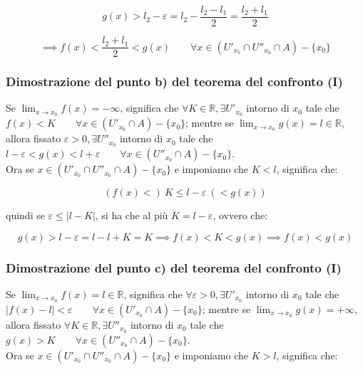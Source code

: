 \documentclass{article}
\begin{document}
\begin{equation*}
    g(x) > l_2 - \varepsilon = l_2 - \frac{l_2 - l_1}{2} = \frac{l_2 + l_1}{2}
\end{equation*}

\begin{equation*}
    \implies f(x) < \frac{l_2 + l_1}{2} < g(x) \qquad \forall x \in (U'_{x_0} \cap U''_{x_0} \cap A) - \{x_0\}
\end{equation*}

\subsubsection{Dimostrazione del punto b) del teorema del confronto (I)}
Se $\lim_{x \to x_0} f(x) = - \infty$, significa che $\forall K \in \mathbb{R}, \exists U'_{x_0}$ intorno di $x_0$ tale che $f(x) < K \qquad \forall x \in (U'_{x_0} \cap A) - \{x_0\}$; mentre se $\lim_{x \to x_0} g(x) = l \in \mathbb{R}$, allora fissato $\varepsilon > 0, \exists U''_{x_0}$ intorno di $x_0$ tale che $l - \varepsilon < g(x) < l + \varepsilon \qquad \forall x \in (U''_{x_0} \cap A) - \{x_0\}$.\\
Ora se $x \in (U'_{x_0} \cap U''_{x_0} \cap A) - \{x_0\}$ e imponiamo che $K < l$, significa che:

\begin{equation*}
    (f(x) <) \ K \leq l - \varepsilon \ (< g(x))
\end{equation*}

\noindent quindi se $\varepsilon \leq |l - K|$, si ha che al più $K = l - \varepsilon$, ovvero che:

\begin{equation*}
    g(x) > l - \varepsilon = l - l + K = K \implies f(x) < K < g(x) \implies f(x) < g(x)
\end{equation*}

\subsubsection{Dimostrazione del punto c) del teorema del confronto (I)}
Se $\lim_{x \to x_0} f(x) = l \in \mathbb{R}$, significa che $\forall \varepsilon > 0, \exists U'_{x_0}$ intorno di $x_0$ tale che $|f(x) - l| < \varepsilon \qquad \forall x \in (U'_{x_0} \cap A) - \{x_0\}$; mentre se $\lim_{x \to x_0} g(x) = +\infty$, allora fissato $\forall K \in \mathbb{R}, \exists U''_{x_0}$ intorno di $x_0$ tale che $g(x) > K \qquad \forall x \in (U''_{x_0} \cap A) - \{x_0\}$.\\
Ora se $x \in (U'_{x_0} \cap U''_{x_0} \cap A) - \{x_0\}$ e imponiamo che $K > l$, significa che:
\end{document}
